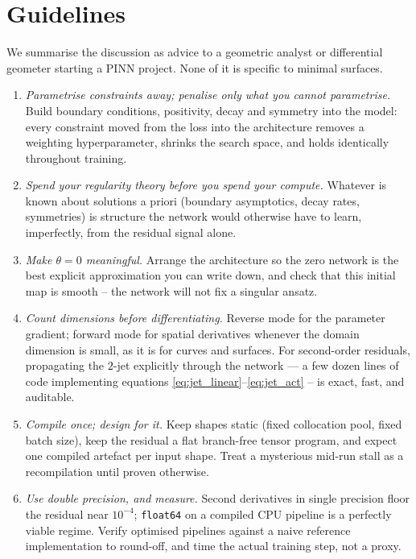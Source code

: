 \documentclass[oneside,british]{amsart}
\numberwithin{equation}{section}
\numberwithin{figure}{section}
\theoremstyle{plain}
\numberwithin{thm}{section}
\theoremstyle{plain}
\theoremstyle{plain}
\theoremstyle{definition}
\theoremstyle{remark}
\begin{document}
\section{Guidelines}\label{sec:guidelines}

We summarise the discussion as advice to a geometric analyst or differential geometer starting a
PINN project. None of it is specific to minimal surfaces.

\begin{enumerate}
\item \emph{Parametrise constraints away; penalise only what you
cannot parametrise.} Build boundary conditions, positivity, decay and
symmetry into the model: every constraint moved from the loss into the
architecture removes a weighting hyperparameter, shrinks the search
space, and holds identically throughout training.
\item \emph{Spend your regularity theory before you spend your
compute.} Whatever is known about solutions a priori (boundary
asymptotics, decay rates, symmetries) is structure the network would
otherwise have to learn, imperfectly, from the residual signal alone.
\item \emph{Make $\theta=0$ meaningful.} Arrange the architecture so
the zero network is the best explicit approximation you can write down,
and check that this initial map is smooth -- the network will not fix
a singular ansatz.
\item \emph{Count dimensions before differentiating.} Reverse mode for
the parameter gradient; forward mode for spatial derivatives whenever
the domain dimension is small, as it is for curves and surfaces. For
second-order residuals, propagating the $2$-jet explicitly through the
network --- a few dozen lines of code implementing equations
\eqref{eq:jet_linear}--\eqref{eq:jet_act} -- is exact, fast, and
auditable.
\item \emph{Compile once; design for it.} Keep shapes static (fixed
collocation pool, fixed batch size), keep the residual a flat
branch-free tensor program, and expect one compiled artefact per input
shape. Treat a mysterious mid-run stall as a recompilation until proven
otherwise.
\item \emph{Use double precision, and measure.} Second derivatives in
single precision floor the residual near $10^{-4}$; \texttt{float64} on
a compiled CPU pipeline is a perfectly viable regime. Verify optimised
pipelines against a naive reference implementation to round-off, and
time the actual training step, not a proxy.
\end{enumerate}
\end{document}
